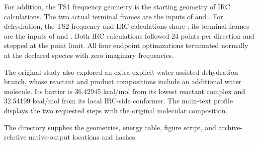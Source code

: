 For addition, the TS1 frequency geometry is the starting geometry of  IRC calculations. The two actual terminal frames are the inputs of  and . For dehydration, the TS2 frequency and IRC calculations share ; its terminal frames are the inputs of  and . Both IRC calculations followed 24 points per direction and stopped at the point limit. All four endpoint optimizations terminated normally at the declared species with zero imaginary frequencies.

The original study also explored an extra explicit-water-assisted dehydration branch, whose reactant and product compositions include an additional water molecule. Its barrier is 36.42945 kcal/mol from its lowest reactant complex and 32.54199 kcal/mol from its local IRC-side conformer. The main-text profile displays the two requested steps with the original molecular composition.

The directory  supplies the geometries, energy table, figure script, and archive-relative native-output locations and hashes.

